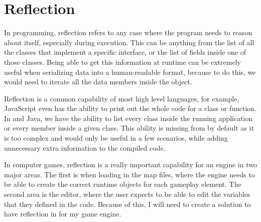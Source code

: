\section{Reflection}

In programming, reflection refers to any case where the program needs to reason about itself, especially during execution.
This can be anything from the list of all the classes that implement a specific interface, or the list of fields inside one of those classes.
Being able to get this information at runtime can be extremely useful when serializing data into a human-readable format, because to do this, we would need to iterate all the data members inside the object.

Reflection is a common capability of most high level languages, for example, JavaScript even has the ability to print out the whole code for a class or function.
In \Csh and Java, we have the ability to list every class inside the running application or every member inside a given class. This ability is missing from \Cpp by default as it is too complex and would only be useful in a few scenarios, while adding unnecessary extra information to the compiled code.

In computer games, reflection is a really important capability for an engine in two major areas. The first is when loading in the map files, where the engine needs to be able to create the correct runtime objects for each gameplay element. The second area is the editor, where the user expects to be able to edit the variables that they defined in the code. Because of this, I will need to create a solution to have reflection in \Cpp for my game engine.